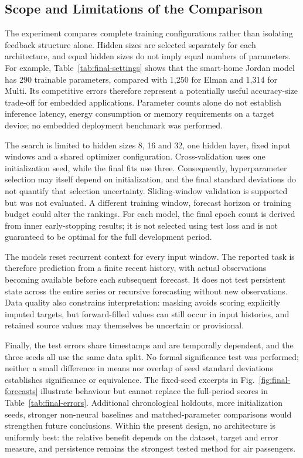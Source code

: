 \subsection{Scope and Limitations of the Comparison}
The experiment compares complete training configurations rather than isolating
feedback structure alone. Hidden sizes are selected separately for each
architecture, and equal hidden sizes do not imply equal numbers of parameters.
For example, Table~\ref{tab:final-settings} shows that the smart-home Jordan
model has 290 trainable parameters, compared with 1,250 for Elman and 1,314 for
Multi. Its competitive errors therefore represent a potentially useful
accuracy-size trade-off for embedded applications. Parameter counts alone do not
establish inference latency, energy consumption or memory requirements on a
target device; no embedded deployment benchmark was performed.

The search is limited to hidden sizes 8, 16 and 32, one hidden layer, fixed
input windows and a shared optimizer configuration. Cross-validation uses one
initialization seed, while the final fits use three. Consequently,
hyperparameter selection may itself depend on initialization, and the final
standard deviations do not quantify that selection uncertainty. Sliding-window
validation is supported but was not evaluated. A different training window,
forecast horizon or training budget could alter the rankings. For each model,
the final epoch count is derived from inner early-stopping results; it is not
selected using test loss and is not guaranteed to be optimal for the full
development period.

The models reset recurrent context for every input window. The reported task is
therefore prediction from a finite recent history, with actual observations
becoming available before each subsequent forecast. It does not test persistent
state across the entire series or recursive forecasting without new
observations. Data quality also constrains interpretation: masking avoids
scoring explicitly imputed targets, but forward-filled values can still occur in
input histories, and retained source values may themselves be uncertain or
provisional.

Finally, the test errors share timestamps and are temporally dependent, and the
three seeds all use the same data split. No formal significance test was
performed; neither a small difference in means nor overlap of seed standard
deviations establishes significance or equivalence. The fixed-seed excerpts in
Fig.~\ref{fig:final-forecasts} illustrate behaviour but cannot replace the
full-period scores in Table~\ref{tab:final-errors}. Additional chronological
holdouts, more initialization seeds, stronger non-neural baselines and
matched-parameter comparisons would strengthen future conclusions. Within the
present design, no architecture is uniformly best: the relative benefit depends
on the dataset, target and error measure, and persistence remains the strongest
tested method for air passengers.

